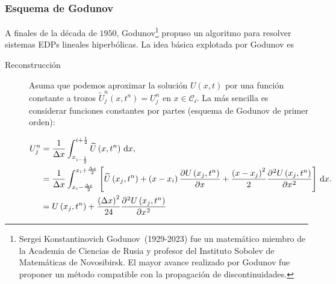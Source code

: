 \subsubsection*{Esquema de Godunov}

A finales de la década de $1950$,
Godunov\footnote{Sergei Konstantinovich Godunov~(1929-2023) fue un
	matemático miembro de la Academia de Ciencias de Rusia y profesor
	del Instituto Sobolev de Matemáticas de Novosibirsk.
	El mayor avance realizado por Godunov fue proponer un método
	compatible con la propagación de discontinuidades.} propuso un
algoritmo para resolver sistemas EDPs lineales hiperbólicas.
La idea básica explotada por Godunov es

\begin{description}
	\item[Reconstrucción]

	      Asuma que podemos aproximar la solución
	      \begin{math}
		      U
		      \left(x,t\right)
	      \end{math}
	      por una función constante a trozos
	      \begin{math}
		      \widetilde{U}^{n}_{j}
		      \left(x,t^{n}\right)=
		      U^{n}_{j}
	      \end{math}
	      en $x\in\mathcal{C_{i}}$.
	      La más sencilla es considerar funciones constantes por partes
	      (esquema de Godunov de primer orden):

	      \begin{align*}
		      U^{n}_{j}
		       & =
		      \frac{1}{\Delta x}
		      \int_{x_{i-\frac{1}{2}}}^{i+\frac{1}{2}}
		      \widetilde{U}
		      \left(x,t^{n}\right)
		      \dl x, \\
		       & =
		      \frac{1}{\Delta x}
		      \int_{x_{i}-\frac{\Delta x}{2}}^{x_{i}+\frac{\Delta x}{2}}
		      \left[
			      \widetilde{U}
			      \left(x_{j},t^{n}\right)+
			      \left(x-x_{i}\right)
			      \diffp{U\left(x_{j},t^{n}\right)}{x}+
			      \frac{{\left(x-x_{j}\right)}^{2}}{2}
			      \diffp[2]{U\left(x_{j},t^{n}\right)}{x}
			      \right]
		      \dl x. \\
		       & =
		      U\left(x_{j},t^{n}\right)+
		      \frac{{\left(\Delta x\right)}^{2}}{24}
		      \diffp[2]{U\left(x_{j},t^{n}\right)}{x}
	      \end{align*}


\end{description}

